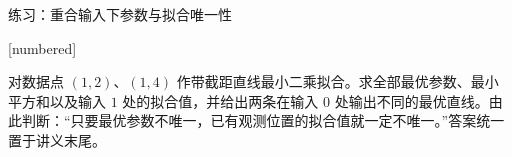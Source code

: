 \documentclass[aspectratio=169,10pt,fontset=fandol]{ctexbeamer}
\makeatletter
\newcommand{\mathagentexerciselabelcontext}[1]{%
\hypertarget<1>{#1}{}%
\edef\@currentHref{#1}%
}
\makeatother
\begin{document}
\begin{frame}[t,fragile]{练习：重合输入下参数与拟合唯一性}
\normalsize
{\normalsize
[numbered]
\mathagentexerciselabelcontext{mathagent.exercise.U0051.0}
\begin{exercise}
\label{mathagent:exercise:2a86525c0362bd6004ffb20b570bb82a80598d07bb305d4bd130c7cd7cc87533}
对数据点 $(1,2)$、$(1,4)$ 作带截距直线最小二乘拟合。求全部最优参数、最小平方和以及输入 $1$ 处的拟合值，并给出两条在输入 $0$ 处输出不同的最优直线。由此判断：“只要最优参数不唯一，已有观测位置的拟合值就一定不唯一。”答案统一置于讲义末尾。
\end{exercise}
}
\end{frame}
\end{document}
